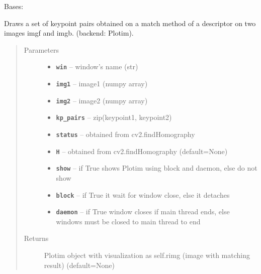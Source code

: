 \documentclass[letterpaper,10pt,english]{sphinxmanual}
\begin{document}
\begin{fulllineitems}
\label{RRtoolbox.lib:RRtoolbox.lib.plotter.MatchExplorer}
Bases: {\hyperref[RRtoolbox.lib:RRtoolbox.lib.plotter.Plotim]{\emph{}}}

Draws a set of keypoint pairs obtained on a match method of a descriptor
on two images imgf and imgb. (backend: Plotim).
\begin{quote}\begin{description}
\item[{Parameters}] \leavevmode\begin{itemize}
\item {} 
\textbf{\texttt{win}} -- window's name (str)

\item {} 
\textbf{\texttt{img1}} -- image1 (numpy array)

\item {} 
\textbf{\texttt{img2}} -- image2 (numpy array)

\item {} 
\textbf{\texttt{kp\_pairs}} -- zip(keypoint1, keypoint2)

\item {} 
\textbf{\texttt{status}} -- obtained from cv2.findHomography

\item {} 
\textbf{\texttt{H}} -- obtained from cv2.findHomography (default=None)

\item {} 
\textbf{\texttt{show}} -- if True shows Plotim using block and daemon, else do not show

\item {} 
\textbf{\texttt{block}} -- if True it wait for window close, else it detaches

\item {} 
\textbf{\texttt{daemon}} -- if True window closes if main thread ends, else windows must be closed to main thread to end

\end{itemize}

\item[{Returns}] \leavevmode
Plotim object with visualization as self.rimg (image with matching result) (default=None)


\end{description}
\end{quote}
\end{fulllineitems}
\end{document}
